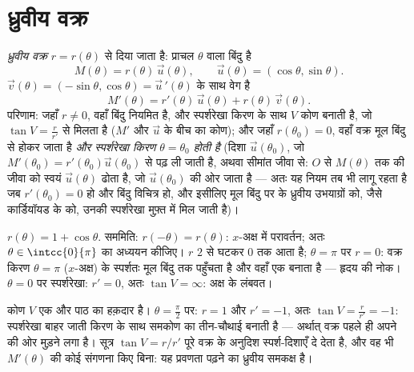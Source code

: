 \section{ध्रुवीय वक्र}

\begin{definition}\label{def:b1:curves:polar}
\emph{ध्रुवीय वक्र} $r = r(\theta)$ से दिया जाता है:
प्राचल $\theta$ वाला बिंदु है
\[
M(\theta) = r(\theta)\,\vec u(\theta),
\qquad \vec u(\theta) = (\cos\theta, \sin\theta).
\]
$\vec v(\theta) = (-\sin\theta, \cos\theta) = \vec u\,'(\theta)$ के साथ वेग
है
\[
M'(\theta) = r'(\theta)\, \vec u(\theta) + r(\theta)\, \vec
v(\theta) .
\]
परिणाम: जहाँ $r \neq 0$, वहाँ बिंदु नियमित है, और स्पर्शरेखा किरण के साथ $V$
कोण बनाती है, जो $\tan V = \frac{r}{r'}$ से मिलता है ($M'$ और $\vec u$ के
बीच का कोण); और जहाँ $r(\theta_0) = 0$, वहाँ वक्र मूल बिंदु से होकर जाता है
\emph{और स्पर्शरेखा किरण $\theta = \theta_0$ होती है} (दिशा $\vec
u(\theta_0)$, जो $M'(\theta_0) = r'(\theta_0)\vec u(\theta_0)$ से पढ़ ली
जाती है, अथवा सीमांत जीवा से: $O$ से $M(\theta)$ तक की जीवा को स्वयं $\vec
u(\theta)$ ढोता है, जो $\vec u(\theta_0)$ की ओर जाता है --- अतः यह नियम तब
भी लागू रहता है जब $r'(\theta_0) = 0$ हो और बिंदु विचित्र हो, और इसीलिए मूल
बिंदु पर के ध्रुवीय उभयाग्रों को, जैसे कार्डियॉयड के  को, उनकी
स्पर्शरेखा मुफ़्त में मिल जाती है)।
\end{definition}

\begin{example}[कार्डियॉयड]\label{ex:b1:curves:cardioid}
$r(\theta) = 1 + \cos\theta$. सममिति: $r(-\theta) =
r(\theta)$: $x$-अक्ष में परावर्तन; अतः $\theta \in \intcc{0}{\pi}$ का अध्ययन
कीजिए। $r$ $2$ से घटकर $0$ तक आता है; $\theta = \pi$ पर $r = 0$: वक्र किरण
$\theta = \pi$ ($x$-अक्ष) के स्पर्शतः मूल बिंदु तक पहुँचता है और वहाँ एक
 बनाता है --- हृदय की नोक। $\theta = 0$ पर स्पर्शरेखा: $r' = 0$, अतः
$\tan V = \infty$: अक्ष के लंबवत।

कोण $V$ एक और पाठ का हक़दार है। $\theta = \frac\pi2$ पर: $r = 1$ और $r' =
-1$, अतः $\tan V = \frac{r}{r'} = -1$: स्पर्शरेखा बाहर जाती किरण के साथ
समकोण का तीन-चौथाई बनाती है --- अर्थात् वक्र पहले ही अपने  की ओर
मुड़ने लगा है। सूत्र $\tan V = r/r'$ पूरे वक्र के अनुदिश स्पर्श-दिशाएँ दे
देता है, और वह भी $M'(\theta)$ की कोई संगणना किए बिना: यह प्रवणता पढ़ने का
ध्रुवीय समकक्ष है।
\end{example}

